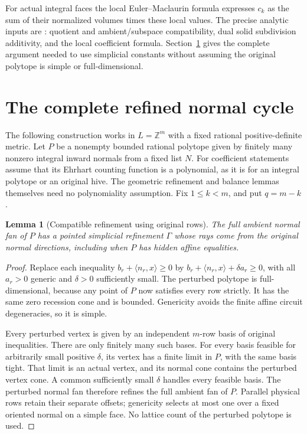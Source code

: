 \documentclass[11pt]{article}
\newtheorem{lemma}[theorem]{Lemma}
\theoremstyle{definition}\newtheorem{definition}[theorem]{Definition}
\theoremstyle{remark}\newtheorem{remark}[theorem]{Remark}
\newcommand{\Z}{\mathbb Z}\newcommand{\Q}{\mathbb Q}\newcommand{\R}{\mathbb R}
\begin{document}
For actual integral faces the local Euler--Maclaurin formula expresses
\(c_k\) as the sum of their normalized volumes times these local values.
The precise analytic inputs are \cite[Propositions 12--13, Definition 22,
Corollary 23, Theorem 26]{bv}: quotient and ambient/subspace compatibility,
dual solid subdivision additivity, and the local coefficient formula.
Section~\ref{sec:balance} gives the complete argument needed to use
simplicial constants without assuming the original polytope is simple or
full-dimensional.

\section{The complete refined normal cycle}\label{sec:balance}
The following construction works in \(L=\Z^m\) with a fixed rational
positive-definite metric. Let \(P\) be a nonempty bounded rational polytope
given by finitely many nonzero integral inward normals from a fixed list
\(N\). For coefficient statements assume that its Ehrhart counting function
is a polynomial, as it is for an integral polytope or an original hive.
The geometric refinement and balance lemmas themselves need no polynomiality
assumption. Fix \(1\leq k<m\), and put \(q=m-k\).

\begin{lemma}[Compatible refinement using original rows]\label{lem:fan}
The full ambient normal fan of \(P\) has a pointed simplicial refinement
\(\Gamma\) whose rays come from the original normal directions, including
when \(P\) has hidden affine equalities.
\end{lemma}
\begin{proof}
Replace each inequality \(b_r+\langle n_r,x\rangle\geq0\) by
\(b_r+\langle n_r,x\rangle+\delta a_r\geq0\), with all \(a_r>0\)
generic and \(\delta>0\) sufficiently small. The perturbed polytope is
full-dimensional, because any point of \(P\) now satisfies every row
strictly. It has the same zero recession cone and is bounded. Genericity
avoids the finite affine circuit degeneracies, so it is simple.

Every perturbed vertex is given by an independent \(m\)-row basis of
original inequalities. There are only finitely many such bases. For every
basis feasible for arbitrarily small positive \(\delta\), its vertex
has a finite limit in \(P\), with the same basis tight. That limit is
an actual vertex, and its normal cone contains the perturbed vertex cone.
A common sufficiently small \(\delta\) handles every feasible basis.
The perturbed normal fan therefore refines the full ambient fan of \(P\).
Parallel physical rows retain their separate offsets; genericity selects
at most one over a fixed oriented normal on a simple face.
No lattice count of the perturbed polytope is used.
\end{proof}
\end{document}
